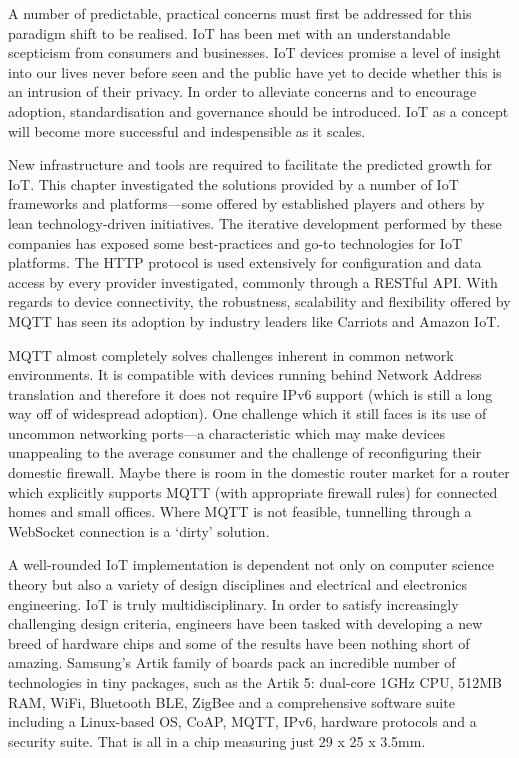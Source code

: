     A number of predictable, practical concerns must first be addressed for this paradigm shift to be realised. IoT has been met with an understandable scepticism from consumers and businesses. IoT devices promise a level of insight into our lives never before seen and the public have yet to decide whether this is an intrusion of their privacy. In order to alleviate concerns and to encourage adoption, standardisation and governance should be introduced. IoT as a concept will become more successful and indespensible as it scales.

    New infrastructure and tools are required to facilitate the predicted growth for IoT. This chapter investigated the solutions provided by a number of IoT frameworks and platforms---some offered by established players and others by lean technology-driven initiatives. The iterative development performed by these companies has exposed some best-practices and go-to technologies for IoT platforms. The HTTP protocol is used extensively for configuration and data access by every provider investigated, commonly through a RESTful API. With regards to device connectivity, the robustness, scalability and flexibility offered by MQTT has seen its adoption by industry leaders like Carriots and Amazon IoT.

    MQTT almost completely solves challenges inherent in common network environments. It is compatible with devices running behind Network Address translation and therefore it does not require IPv6 support (which is still a long way off of widespread adoption). One challenge which it still faces is its use of uncommon networking ports---a characteristic which may make devices unappealing to the average consumer and the challenge of reconfiguring their domestic firewall. Maybe there is room in the domestic router market for a router which explicitly supports MQTT (with appropriate firewall rules) for connected homes and small offices. Where MQTT is not feasible, tunnelling through a WebSocket connection is a `dirty' solution.

    A well-rounded IoT implementation is dependent not only on computer science theory but also a variety of design disciplines and electrical and electronics engineering. IoT is truly multidisciplinary. In order to satisfy increasingly challenging design criteria, engineers have been tasked with developing a new breed of hardware chips and some of the results have been nothing short of amazing. Samsung's Artik family of boards pack an incredible number of technologies in tiny packages, such as the Artik 5: dual-core 1GHz CPU, 512MB RAM, WiFi, Bluetooth BLE, ZigBee and a comprehensive software suite including a Linux-based OS, CoAP, MQTT, IPv6, hardware protocols and a security suite. That is all in a chip measuring just 29 x 25 x 3.5mm.

